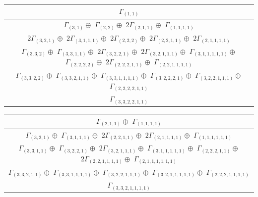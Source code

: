 \documentclass[main.tex]{subfiles}
\begin{document}
\begin{minipage}{1\textwidth}
\centering
\begin{tabular}{c}
$\Gamma_{(
1 , 
1
)}$
\\ \hline
$\Gamma_{(
3 , 
1
)} \oplus$
$\Gamma_{(
2 , 
2
)} \oplus$
$ 2 \Gamma_{(
2 , 
1 , 
1
)} \oplus$
$\Gamma_{(
1 , 
1 , 
1 , 
1
)}$
\\ \hline
$ 2 \Gamma_{(
3 , 
2 , 
1
)} \oplus$
$ 2 \Gamma_{(
3 , 
1 , 
1 , 
1
)} \oplus$
$ 2 \Gamma_{(
2 , 
2 , 
2
)} \oplus$
$ 2 \Gamma_{(
2 , 
2 , 
1 , 
1
)} \oplus$
$ 2 \Gamma_{(
2 , 
1 , 
1 , 
1 , 
1
)}$
\\ \hline
$\Gamma_{(
3 , 
3 , 
2
)} \oplus$
$\Gamma_{(
3 , 
3 , 
1 , 
1
)} \oplus$
$ 2 \Gamma_{(
3 , 
2 , 
2 , 
1
)} \oplus$
$ 2 \Gamma_{(
3 , 
2 , 
1 , 
1 , 
1
)} \oplus$
$\Gamma_{(
3 , 
1 , 
1 , 
1 , 
1 , 
1
)} \oplus$
$\Gamma_{(
2 , 
2 , 
2 , 
2
)} \oplus$
$ 2 \Gamma_{(
2 , 
2 , 
2 , 
1 , 
1
)} \oplus$
$\Gamma_{(
2 , 
2 , 
1 , 
1 , 
1 , 
1
)}$
\\ \hline
$\Gamma_{(
3 , 
3 , 
2 , 
2
)} \oplus$
$\Gamma_{(
3 , 
3 , 
2 , 
1 , 
1
)} \oplus$
$\Gamma_{(
3 , 
3 , 
1 , 
1 , 
1 , 
1
)} \oplus$
$\Gamma_{(
3 , 
2 , 
2 , 
2 , 
1
)} \oplus$
$\Gamma_{(
3 , 
2 , 
2 , 
1 , 
1 , 
1
)} \oplus$
$\Gamma_{(
2 , 
2 , 
2 , 
2 , 
1 , 
1
)}$
\\ \hline
$\Gamma_{(
3 , 
3 , 
2 , 
2 , 
1 , 
1
)}$
\\
\end{tabular}\end{minipage}
\bigskip
\begin{minipage}{1\textwidth}
\centering
\begin{tabular}{c}
$\Gamma_{(
2 , 
1 , 
1
)} \oplus$
$\Gamma_{(
1 , 
1 , 
1 , 
1
)}$
\\ \hline
$\Gamma_{(
3 , 
2 , 
1
)} \oplus$
$\Gamma_{(
3 , 
1 , 
1 , 
1
)} \oplus$
$ 2 \Gamma_{(
2 , 
2 , 
1 , 
1
)} \oplus$
$ 2 \Gamma_{(
2 , 
1 , 
1 , 
1 , 
1
)} \oplus$
$\Gamma_{(
1 , 
1 , 
1 , 
1 , 
1 , 
1
)}$
\\ \hline
$\Gamma_{(
3 , 
3 , 
1 , 
1
)} \oplus$
$\Gamma_{(
3 , 
2 , 
2 , 
1
)} \oplus$
$ 2 \Gamma_{(
3 , 
2 , 
1 , 
1 , 
1
)} \oplus$
$\Gamma_{(
3 , 
1 , 
1 , 
1 , 
1 , 
1
)} \oplus$
$\Gamma_{(
2 , 
2 , 
2 , 
1 , 
1
)} \oplus$
$ 2 \Gamma_{(
2 , 
2 , 
1 , 
1 , 
1 , 
1
)} \oplus$
$\Gamma_{(
2 , 
1 , 
1 , 
1 , 
1 , 
1 , 
1
)}$
\\ \hline
$\Gamma_{(
3 , 
3 , 
2 , 
1 , 
1
)} \oplus$
$\Gamma_{(
3 , 
3 , 
1 , 
1 , 
1 , 
1
)} \oplus$
$\Gamma_{(
3 , 
2 , 
2 , 
1 , 
1 , 
1
)} \oplus$
$\Gamma_{(
3 , 
2 , 
1 , 
1 , 
1 , 
1 , 
1
)} \oplus$
$\Gamma_{(
2 , 
2 , 
2 , 
1 , 
1 , 
1 , 
1
)}$
\\ \hline
$\Gamma_{(
3 , 
3 , 
2 , 
1 , 
1 , 
1 , 
1
)}$
\\
\end{tabular}\end{minipage}
\end{document}
